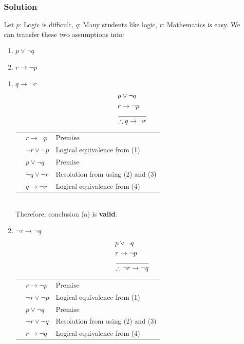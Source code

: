 \documentclass{article}
\newcounter{rown}
\newcounter{rownm}
\newcommand{\rowq}[2]{\stepcounter{rownm}\arabic{rownm} & #1 & #2 \\}
\begin{document}
\subsubsection*{Solution}
Let $p$: Logic is difficult, $q$: Many students like logic, $r$: Mathematics is easy.
We can transfer these two assumptions into:
\begin{enumerate}
    \item $p \lor \lnot q$
    \item $r \to \lnot p$
\end{enumerate}
\begin{enumerate} [label = (\alph*)]
    \item $q \to \lnot r$
          \begin{align*}
               & p \lor \lnot q                 \\
               & r \to \lnot p                  \\
               & \over\therefore  q \to \lnot r
          \end{align*}
          \begin{tabular}{r l l}
              \rowq{$r \to \lnot p$}{Premise}
              \rowq{$\lnot r \lor \lnot p$}{Logical equivalence from (1)}
              \rowq{$p \lor \lnot q$}{Premise}
              \rowq{$\lnot q \lor \lnot r$}{Resolution from using (2) and (3)}
              \rowq{$q \to \lnot r$}{Logical equivalence from (4)}
          \end{tabular}\\

          Therefore, conclusion (a) is \textbf{valid}.
    \item $\lnot r \to \lnot q$
          \newcommand{\rowss}[2]{\stepcounter{rows}\arabic{rows} & #1 & #2 \\}
          \begin{align*}
               & p \lor \lnot q                       \\
               & r \to \lnot p                        \\
               & \over\therefore  \lnot r \to \lnot q
          \end{align*}
          \begin{tabular}{r l l}
              \rowss{$r \to \lnot p$}{Premise}
              \rowss{$\lnot r \lor \lnot p$}{Logical equivalence from (1)}
              \rowss{$p \lor \lnot q$}{Premise}
              \rowss{$\lnot r \lor \lnot q$}{Resolution from using (2) and (3)}
              \rowss{$r \to \lnot q$}{Logical equivalence from (4)}
          \end{tabular}\\


\end{enumerate}
\end{document}
